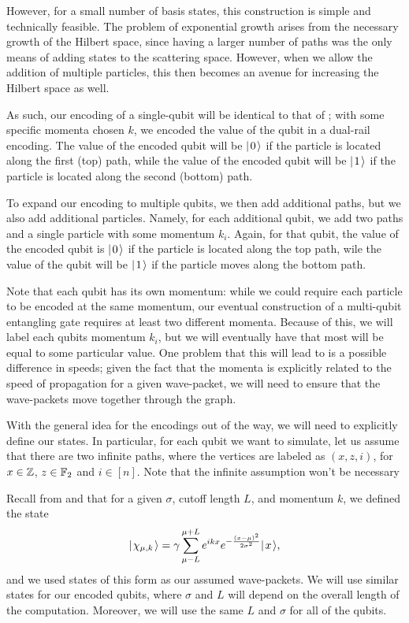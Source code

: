 \documentclass[../thesis-main/thesis-main]{subfiles}
\begin{document}
However, for a small number of basis states, this construction is simple and technically feasible.  The problem of exponential growth arises from the necessary growth of the Hilbert space, since having a larger number of paths was the only means of adding states to the scattering space.  However, when we allow the addition of multiple particles, this then becomes an avenue for increasing the Hilbert space as well.

As such, our encoding of a single-qubit will be identical to that of ; with some specific momenta chosen $k$, we encoded the value of the qubit in a dual-rail encoding.  The value of the encoded qubit will be $|\mspace{2mu} 0 \mspace{2mu} \rangle$ if the particle is located along the first (top) path, while the value of the encoded qubit will be $|\mspace{2mu} 1 \mspace{2mu} \rangle$ if the particle is located along the second (bottom) path.

To expand our encoding to multiple qubits, we then add additional paths, but we also add additional particles.  Namely, for each additional qubit, we add two paths and a single particle with some momentum $k_i$.  Again, for that qubit, the value of the encoded qubit is $|\mspace{2mu} 0 \mspace{2mu} \rangle$ if the particle is located along the top path, wile the value of the qubit will be $|\mspace{2mu} 1 \mspace{2mu} \rangle$ if the particle moves along the bottom path.

Note that each qubit has its own momentum: while we could require each particle to be encoded at the same momentum, our eventual construction of a multi-qubit entangling gate requires at least two different momenta.  Because of this, we will label each qubits momentum $k_i$, but we will eventually have that most will be equal to some particular value.  One problem that this will lead to is a possible difference in speeds; given the fact that the momenta is explicitly related to the speed of propagation for a given wave-packet, we will need to ensure that the wave-packets move together through the graph.

With the general idea for the encodings out of the way, we will need to explicitly define our states.  In particular, for each qubit we want to simulate, let us assume that there are two infinite paths, where the vertices are labeled as $(x,z,i)$, for $x\in \mathbb{Z}$, $z\in \mathbb{F}_2$ and $i\in[n]$.  Note that the infinite assumption won't be necessary 

Recall from  and  that for a given $\sigma$, cutoff length $L$, and momentum $k$, we defined the state
\begin{align}
  |\mspace{2mu} \chi_{\mu,k} \mspace{2mu} \rangle = \gamma \sum_{\mu - L}^{\mu + L} e^{ikx} e^{-\frac{(x-\mu)^2}{2\sigma^2}} |\mspace{2mu} x \mspace{2mu} \rangle,
\end{align}
and we used states of this form as our assumed wave-packets.  We will use similar states for our encoded qubits, where $\sigma$ and $L$ will depend on the overall length of the computation.  Moreover, we will use the same $L$ and $\sigma$ for all of the qubits.
\end{document}
